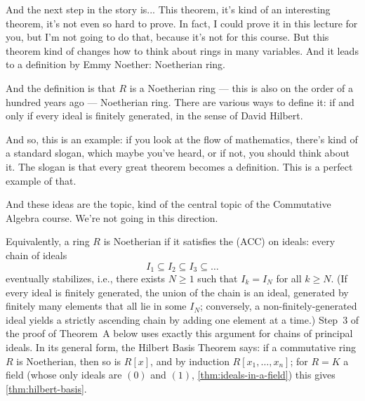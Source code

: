\begin{speech}[00:03:30 - 00:04:50]
And the next step in the story is... This theorem, it's kind of an interesting theorem, it's not even so hard to prove. In fact, I could prove it in this lecture for you, but I'm not going to do that, because it's not for this course. But this theorem kind of changes how to think about rings in many variables. And it leads to a definition by Emmy Noether:  Noetherian ring.

And the definition  is that $R$ is a Noetherian ring --- this is also on the order of a hundred years ago --- Noetherian ring. There are various ways to define it: if and only if every ideal  is finitely generated, in the sense of David Hilbert.

And so, this is an example: if you look at the flow of mathematics, there's kind of a standard slogan, which maybe you've heard, or if not, you should think about it. The slogan is that every great theorem becomes a definition. This is a perfect example of that.

And these ideas are the topic, kind of the central topic of the Commutative Algebra course. We're not going in this direction.
\end{speech}

\begin{content}

\begin{steps}
Equivalently, a ring $R$ is Noetherian if it satisfies the  (ACC) on ideals: every chain of ideals
\[
I_1 \subseteq I_2 \subseteq I_3 \subseteq \dots
\]
eventually stabilizes, i.e., there exists $N \ge 1$ such that $I_k = I_N$ for all $k \ge N$. (If every ideal is finitely generated, the union of the chain is an ideal, generated by finitely many elements that all lie in some $I_N$; conversely, a non-finitely-generated ideal yields a strictly ascending chain by adding one element at a time.) Step~3 of the proof of Theorem~A below uses exactly this argument for chains of principal ideals. In its general form, the Hilbert Basis Theorem says: if a commutative ring $R$ is Noetherian, then so is $R[x]$, and by induction $R[x_1, \dots, x_n]$; for $R = K$ a field (whose only ideals are $(0)$ and $(1)$, \cref{thm:ideals-in-a-field}) this gives \cref{thm:hilbert-basis}.
\end{steps}
\end{content}

